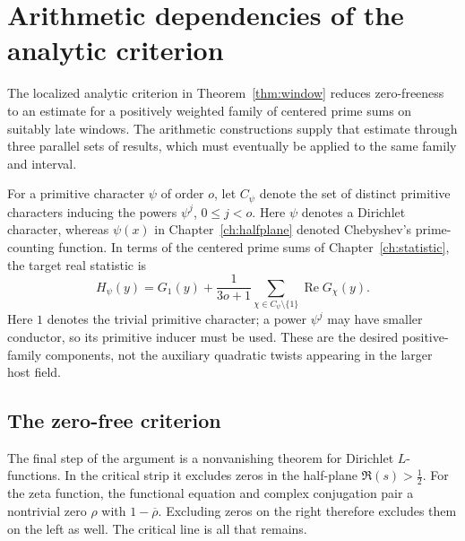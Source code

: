 \documentclass[11pt,openany,oneside]{scrbook}
\theoremstyle{definition}
\theoremstyle{remark}
\newcommand{\Rea}{\operatorname{Re}}
\begin{document}
\chapter*{Arithmetic dependencies of the analytic criterion}
{}
The localized analytic criterion in Theorem~\ref{thm:window} reduces zero-freeness to an estimate for a positively weighted family of centered prime sums on suitably late windows. The arithmetic constructions supply that estimate through three parallel sets of results, which must eventually be applied to the same family and interval.

For a primitive character $\psi$ of order $o$, let $C_\psi$ denote the set of distinct primitive characters inducing the powers $\psi^j$, $0\le j<o$. Here $\psi$ denotes a Dirichlet character, whereas $\psi(x)$ in Chapter~\ref{ch:halfplane} denoted Chebyshev's prime-counting function. In terms of the centered prime sums of Chapter~\ref{ch:statistic}, the target real statistic is
\begin{equation}\label{eq:Hpsi}
H_\psi(y)=G_1(y)+\frac{1}{3o+1}\sum_{\chi\in C_\psi\setminus\{1\}}\Rea G_\chi(y).
\end{equation}
Here $1$ denotes the trivial primitive character; a power $\psi^j$ may have smaller conductor, so its primitive inducer must be used. These are the desired positive-family components, not the auxiliary quadratic twists appearing in the larger host field.

\section*{The zero-free criterion}

The final step of the argument is a nonvanishing theorem for Dirichlet $L$-functions. In the critical strip it excludes zeros in the half-plane $\Re(s)>\tfrac12$. For the zeta function, the functional equation and complex conjugation pair a nontrivial zero $\rho$ with $1-\overline\rho$. Excluding zeros on the right therefore excludes them on the left as well. The critical line is all that remains.
\end{document}
